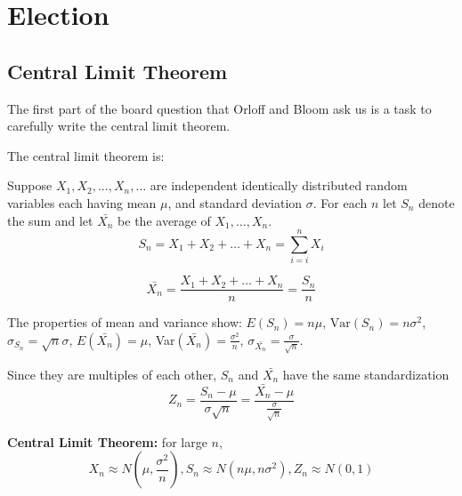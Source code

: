 \documentclass[a4paper,11pt]{article}
\begin{document}
\section{Election}
\subsection{Central Limit Theorem}
The first part of the board question that Orloff and Bloom ask
us is a task to carefully write the central limit theorem.

The central limit theorem is:

Suppose $X_1, X_2, \ldots, X_n, \ldots$ are independent identically distributed
random variables each having mean $\mu$, and standard deviation $\sigma$. For
each $n$ let $S_n$ denote the sum and let $\bar{X_n}$ be the average of
$X_1, \ldots, X_n$.
\begin{equation}
  S_n = X_1 + X_2 + \ldots + X_n = \sum_{i=i}^n X_i
\end{equation}

\begin{equation}
  \bar{X_n} = \frac{X_1 + X_2 + \ldots + X_n}{n} = \frac{S_n}{n}
\end{equation}

The properties of mean and variance show: $E\left(S_n\right)=n\mu$,
$\text{Var}\left( S_n \right)=n\sigma^2$, $\sigma_{S_n}=\sqrt{n}\sigma$,
$E\left(\bar{X_n}\right) = \mu$, Var$\left(\bar{X_n}\right)=\frac{\sigma^2}{n}$,
$\sigma_{\bar{X_n}} = \frac{\sigma}{\sqrt{n}}$.

Since they are multiples of each other, $S_n$ and $\bar{X_n}$ have the same
standardization
\begin{equation}
  Z_n = \frac{S_n- \mu}{\sigma\sqrt{n}}
  = \frac{\bar{X_{n}} - \mu}{\frac{\sigma}{\sqrt{n}}}
\end{equation}

\textbf{Central Limit Theorem:} for large $n$,
\begin{equation}
X_n \approx  N\left( \mu, \frac{\sigma^2}{n} \right), S_n \approx N\left(n\mu, n\sigma^2 \right),
  Z_n \approx N \left(0, 1\right)
\end{equation}

\printbibliography{}
\end{document}
